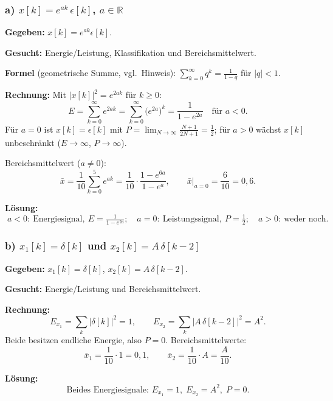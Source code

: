 \subsubsection*{a) $x[k] = e^{ak}\,\epsilon[k]$, $a\in\mathbb{R}$}

\begin{beispiel}

\textbf{Gegeben:} $x[k]=e^{ak}\epsilon[k]$.

\textbf{Gesucht:} Energie/Leistung, Klassifikation und Bereichsmittelwert.

\textbf{Formel} (geometrische Summe, vgl.\ Hinweis):
$\sum_{k=0}^{\infty} q^{k} = \tfrac{1}{1-q}$ für $|q|<1$.

\textbf{Rechnung:} Mit $|x[k]|^2 = e^{2ak}$ für $k\geq 0$:
$$
E = \sum_{k=0}^{\infty} e^{2ak} = \sum_{k=0}^{\infty}\big(e^{2a}\big)^{k}
= \frac{1}{1-e^{2a}} \quad\text{für } a<0.
$$
Für $a=0$ ist $x[k]=\epsilon[k]$ mit $P=\lim_{N\to\infty}\tfrac{N+1}{2N+1}=\tfrac12$;
für $a>0$ wächst $x[k]$ unbeschränkt ($E\to\infty$, $P\to\infty$).

Bereichsmittelwert ($a\neq 0$):
$$
\bar{x} = \frac{1}{10}\sum_{k=0}^{5} e^{ak}
= \frac{1}{10}\cdot\frac{1-e^{6a}}{1-e^{a}}, \qquad
\bar{x}\big|_{a=0} = \frac{6}{10}=0{,}6.
$$

\textbf{Lösung:}
$$
\boxed{\;a<0:\ \text{Energiesignal},\ E=\tfrac{1}{1-e^{2a}};\quad
a=0:\ \text{Leistungssignal},\ P=\tfrac12;\quad
a>0:\ \text{weder noch.}\;}
$$
\end{beispiel}

\subsubsection*{b) $x_1[k]=\delta[k]$ und $x_2[k]=A\,\delta[k-2]$}

\begin{beispiel}[Einzelimpulse]

\textbf{Gegeben:} $x_1[k]=\delta[k]$, $x_2[k]=A\,\delta[k-2]$.

\textbf{Gesucht:} Energie/Leistung und Bereichsmittelwert.

\textbf{Rechnung:}
$$
E_{x_1} = \sum_k |\delta[k]|^2 = 1,\qquad
E_{x_2} = \sum_k |A\,\delta[k-2]|^2 = A^2.
$$
Beide besitzen endliche Energie, also $P=0$. Bereichsmittelwerte:
$$
\bar{x}_1 = \frac{1}{10}\cdot 1 = 0{,}1,\qquad
\bar{x}_2 = \frac{1}{10}\cdot A = \frac{A}{10}.
$$

\textbf{Lösung:}
$$
\boxed{\;\text{Beides Energiesignale: } E_{x_1}=1,\; E_{x_2}=A^2,\; P=0.\;}
$$
\end{beispiel}

